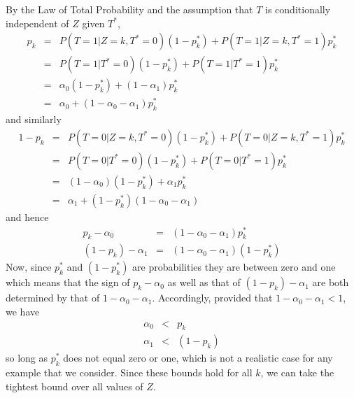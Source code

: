 \documentclass[12pt]{article}
\begin{document}
By the Law of Total Probability and the assumption that $T$ is conditionally independent of $Z$ given $T^*$,
\begin{eqnarray*}
  p_k &=& P(T=1|Z=k,T^*=0) (1 - p_k^*) + P(T=1|Z=k,T^*=1)p_k^*\\
  &=& P(T=1|T^*=0)(1 - p_k^*) + P(T=1|T^*=1)p_k^*\\
  &=& \alpha_0 (1 - p_k^*) + (1 - \alpha_1) p_k^*\\
  &=& \alpha_0 +(1 - \alpha_0 - \alpha_1) p_k^* 
\end{eqnarray*}
and similarly 
\begin{eqnarray*}
  1 - p_k &=& P(T=0|Z=k,T^*=0) (1 - p_k^*) + P(T=0|Z=k,T^*=1)p_k^*\\
  &=& P(T=0|T^*=0)(1 - p_k^*) + P(T=0|T^*=1)p_k^*\\
  &=& (1 - \alpha_0)(1 - p_k^*) + \alpha_1 p_k^*\\
  &=& \alpha_1 + (1 - p_k^*)(1 - \alpha_0 - \alpha_1)
\end{eqnarray*}
and hence
\begin{eqnarray*}
  p_k - \alpha_0 &=& (1 - \alpha_0 - \alpha_1)p_k^*\\
  (1 - p_k) - \alpha_1 &=& (1 - \alpha_0 - \alpha_1)(1 - p_k^*)
\end{eqnarray*}
Now, since $p_k^*$ and $(1 - p_k^*)$ are probabilities they are between zero and one which means that the sign of $p_k - \alpha_0$ as well as that of $(1 - p_k) - \alpha_1$ are both determined by that of $1 - \alpha_0 - \alpha_1$.
Accordingly, provided that $1 - \alpha_0 - \alpha_1 < 1$, we have
\begin{eqnarray*}
  \alpha_0 &<& p_k\\
  \alpha_1 &<& (1 - p_k)
\end{eqnarray*}
so long as $p_k^*$ does not equal zero or one, which is not a realistic case for any example that we consider.
Since these bounds hold for all $k$, we can take the tightest bound over all values of $Z$.
\end{document}
